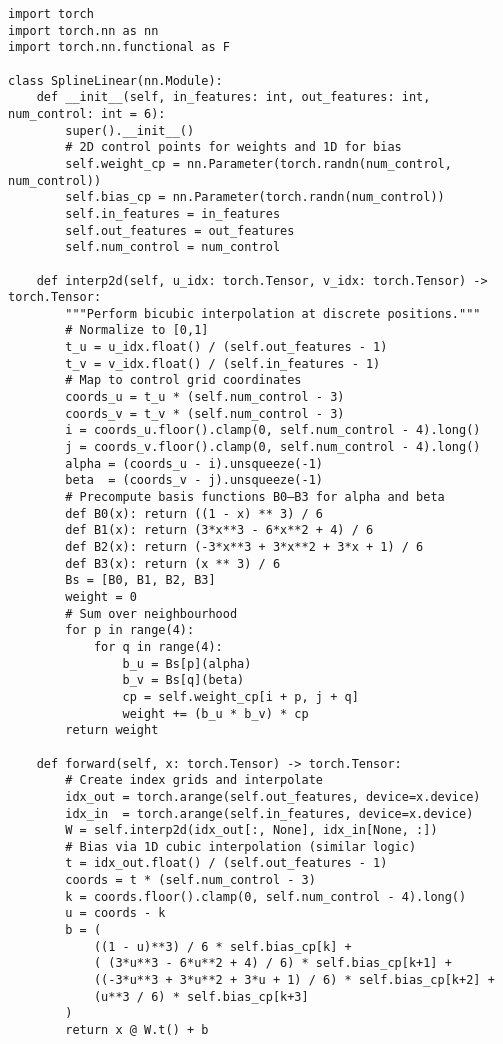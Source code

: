 \documentclass[12pt]{article}
\begin{document}
\begin{lstlisting}[caption={Simplified implementation of a spline‐based linear layer.}]
import torch
import torch.nn as nn
import torch.nn.functional as F

class SplineLinear(nn.Module):
    def __init__(self, in_features: int, out_features: int, num_control: int = 6):
        super().__init__()
        # 2D control points for weights and 1D for bias
        self.weight_cp = nn.Parameter(torch.randn(num_control, num_control))
        self.bias_cp = nn.Parameter(torch.randn(num_control))
        self.in_features = in_features
        self.out_features = out_features
        self.num_control = num_control

    def interp2d(self, u_idx: torch.Tensor, v_idx: torch.Tensor) -> torch.Tensor:
        """Perform bicubic interpolation at discrete positions."""
        # Normalize to [0,1]
        t_u = u_idx.float() / (self.out_features - 1)
        t_v = v_idx.float() / (self.in_features - 1)
        # Map to control grid coordinates
        coords_u = t_u * (self.num_control - 3)
        coords_v = t_v * (self.num_control - 3)
        i = coords_u.floor().clamp(0, self.num_control - 4).long()
        j = coords_v.floor().clamp(0, self.num_control - 4).long()
        alpha = (coords_u - i).unsqueeze(-1)
        beta  = (coords_v - j).unsqueeze(-1)
        # Precompute basis functions B0–B3 for alpha and beta
        def B0(x): return ((1 - x) ** 3) / 6
        def B1(x): return (3*x**3 - 6*x**2 + 4) / 6
        def B2(x): return (-3*x**3 + 3*x**2 + 3*x + 1) / 6
        def B3(x): return (x ** 3) / 6
        Bs = [B0, B1, B2, B3]
        weight = 0
        # Sum over neighbourhood
        for p in range(4):
            for q in range(4):
                b_u = Bs[p](alpha)
                b_v = Bs[q](beta)
                cp = self.weight_cp[i + p, j + q]
                weight += (b_u * b_v) * cp
        return weight

    def forward(self, x: torch.Tensor) -> torch.Tensor:
        # Create index grids and interpolate
        idx_out = torch.arange(self.out_features, device=x.device)
        idx_in  = torch.arange(self.in_features, device=x.device)
        W = self.interp2d(idx_out[:, None], idx_in[None, :])
        # Bias via 1D cubic interpolation (similar logic)
        t = idx_out.float() / (self.out_features - 1)
        coords = t * (self.num_control - 3)
        k = coords.floor().clamp(0, self.num_control - 4).long()
        u = coords - k
        b = (
            ((1 - u)**3) / 6 * self.bias_cp[k] +
            ( (3*u**3 - 6*u**2 + 4) / 6) * self.bias_cp[k+1] +
            ((-3*u**3 + 3*u**2 + 3*u + 1) / 6) * self.bias_cp[k+2] +
            (u**3 / 6) * self.bias_cp[k+3]
        )
        return x @ W.t() + b


\end{lstlisting}
\end{document}
